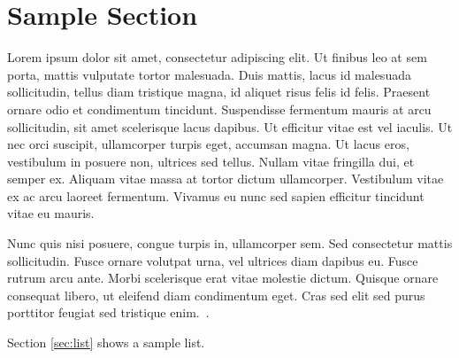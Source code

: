 \section{Sample Section}
Lorem ipsum dolor sit amet, consectetur adipiscing elit. Ut finibus leo at sem porta, mattis vulputate tortor malesuada. Duis mattis, lacus id malesuada sollicitudin, tellus diam tristique magna, id aliquet risus felis id felis. Praesent ornare odio et condimentum tincidunt. Suspendisse fermentum mauris at arcu sollicitudin, sit amet scelerisque lacus dapibus. Ut efficitur vitae est vel iaculis. Ut nec orci suscipit, ullamcorper turpis eget, accumsan magna. Ut lacus eros, vestibulum in posuere non, ultrices sed tellus. Nullam vitae fringilla dui, et semper ex. Aliquam vitae massa at tortor dictum ullamcorper. Vestibulum vitae ex ac arcu laoreet fermentum. Vivamus eu nunc sed sapien efficitur tincidunt vitae eu mauris.

Nunc quis nisi posuere, congue turpis in, ullamcorper sem. Sed consectetur mattis sollicitudin. Fusce ornare volutpat urna, vel ultrices diam dapibus eu. Fusce rutrum arcu ante. Morbi scelerisque erat vitae molestie dictum. Quisque ornare consequat libero, ut eleifend diam condimentum eget. Cras sed elit sed purus porttitor feugiat sed tristique enim.~\cite{CitekeyArticle}.

Section \ref{sec:list} shows a sample list.
